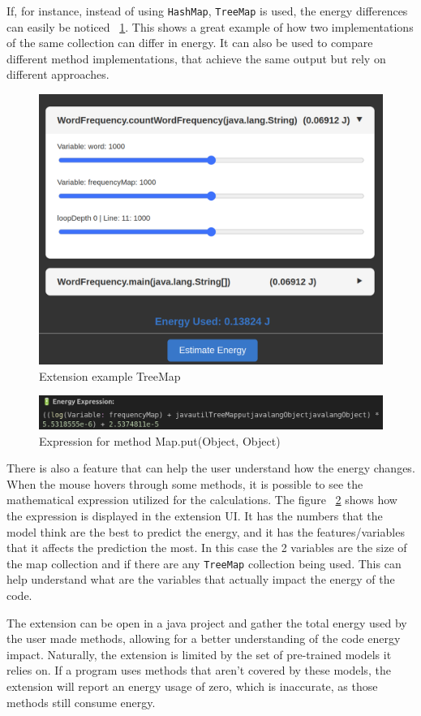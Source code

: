 If, for instance, instead of using \texttt{HashMap}, \texttt{TreeMap} is used, the energy differences can easily be noticed ~\ref{fig:extension_example2}. This shows a great example of how two implementations of the same collection can differ in energy. It can also be used to compare different method implementations, that achieve the same output but rely on different approaches.



\begin{figure}[htbp]
  \centering
  \includegraphics[width = .8 \textwidth]{figures/extension_example2.png}
  \caption{Extension example TreeMap}
  \label{fig:extension_example2}
\end{figure}



\begin{figure}[htbp]
  \centering
  \includegraphics[width = .8 \textwidth]{figures/extension_expression_example.png}
  \caption{Expression for method Map.put(Object, Object)}
  \label{fig:extension_expression_example}
\end{figure}

There is also a feature that can help the user understand how the energy changes. When the mouse hovers through some methods, it is possible to see the mathematical expression utilized for the calculations. The figure ~\ref{fig:extension_expression_example} shows how the expression is displayed in the extension UI. It has the numbers that the model think are the best to predict the energy, and it has the features/variables that it affects the prediction the most. In this case the 2 variables are the size of the map collection and if there are any \texttt{TreeMap} collection being used. This can help understand what are the variables that actually impact the energy of the code. 

The extension can be open in a java project and gather the total energy used by the user made methods, allowing for a better understanding of the code energy impact. Naturally, the extension is limited by the set of pre-trained models it relies on. If a program uses methods that aren't covered by these models, the extension will report an energy usage of zero, which is inaccurate, as those methods still consume energy.